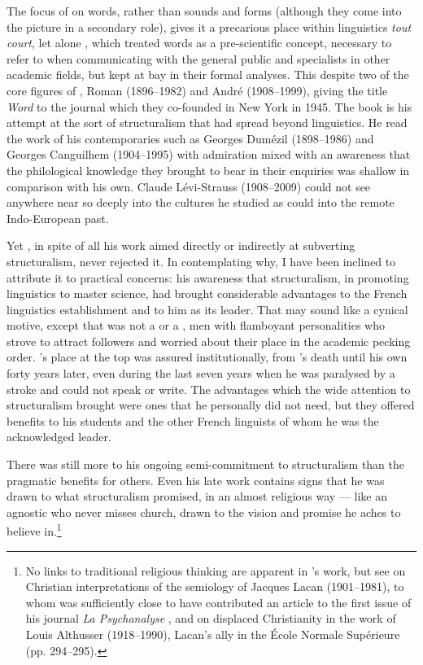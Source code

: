 \documentclass[output=paper]{langscibook}
\begin{document}
The focus of \citet{Benveniste1969vocabulaire} on words, rather than sounds and forms (although they come into the picture in a secondary role), gives it a precarious place within linguistics \emph{tout court}, let alone , which treated words as a pre-scientific concept, necessary to refer to when communicating with the general public and specialists in other academic fields, but kept at bay in their formal analyses. This despite two of the core figures of , Roman {\Jakobson} (1896--1982) and André {\Martinet} (1908--1999), giving the title \emph{Word} to the journal which they co-founded in New York in 1945. The \citeyear{Benveniste1969vocabulaire} book is his attempt at the sort of structuralism that had spread beyond linguistics. He read the work of his contemporaries such as Georges Dumézil (1898--1986) and Georges Canguilhem (1904--1995) with admiration mixed with an awareness that the philological knowledge they brought to bear in their enquiries was shallow in comparison with his own. Claude Lévi-Strauss (1908--2009) could not see anywhere near so deeply into the cultures he studied as {\Benveniste} could into the remote Indo-European past.

Yet {\Benveniste}, in spite of all his work aimed directly or indirectly at subverting structuralism, never rejected it. In contemplating why, I have been inclined to attribute it to practical concerns: his awareness that structuralism, in promoting linguistics to master science, had brought considerable advantages to the French linguistics establishment and to him as its leader. That may sound like a cynical motive, except that {\Benveniste} was not a {\Jakobson} or a {\Martinet}, men with flamboyant personalities who strove to attract followers and worried about their place in the academic pecking order. {\Benveniste}'s place at the top was assured institutionally, from {\Meillet}'s death until his own forty years later, even during the last seven years when he was paralysed by a stroke and could not speak or write. The advantages which the wide attention to structuralism brought were ones that he personally did not need, but they offered benefits to his students and the other French linguists of whom he was the acknowledged leader.

There was still more to his ongoing semi-commitment to structuralism than the pragmatic benefits for others. Even his late work contains signs that he was drawn to what structuralism promised, in an almost religious way — like an agnostic who never misses church, drawn to the vision and promise he aches to believe in.\footnote{No links to traditional religious thinking are apparent in {\Benveniste}'s work, but see \citet[245--247]{Dosse1997} on Christian interpretations of the semiology of Jacques Lacan (1901--1981), to whom {\Benveniste} was sufficiently close to have contributed an article to the first issue of his journal \emph{La Psychanalyse} \citep{Benveniste1956remarques}, and on displaced Christianity in the work of Louis Althusser (1918--1990), Lacan's ally in the École Normale Supérieure (pp. 294--295).}
\end{document}
